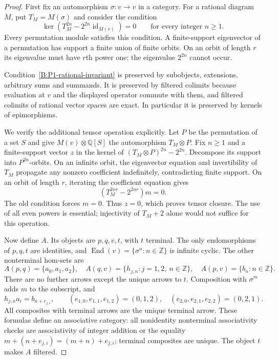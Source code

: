 \begin{proof}
First fix an automorphism $\sigma:v\to v$ in a category. For a rational
diagram $M$, put $T_M=M(\sigma)$ and consider the condition
\begin{equation}\label{B:P1-rational-invariant}
 \ker(T_M^{2n}-2^{2n}\operatorname{id}_{M(v)})=0
 \qquad\text{for every integer }n\geq1.
\end{equation}
Every permutation module satisfies this condition. A finite-support
eigenvector of a permutation has support a finite union of finite
orbits. On an orbit of length $r$ its eigenvalue must have $r$th power
one; the eigenvalue $2^{2n}$ cannot occur.

Condition~\eqref{B:P1-rational-invariant} is preserved by subobjects,
extensions, arbitrary sums and summands. It is preserved by filtered
colimits because evaluation at $v$ and the displayed operator commute
with them, and filtered colimits of rational vector spaces are exact.
In particular it is preserved by kernels of epimorphisms.

We verify the additional tensor operation explicitly. Let $P$ be the
permutation of a set $S$ and give $M(v)\otimes\mathbb Q[S]$ the
automorphism $T_M\otimes P$. Fix $n\geq1$ and a finite-support vector
$z$ in the kernel of
$(T_M\otimes P)^{2n}-2^{2n}$. Decompose its support into $P^{2n}$-orbits.
On an infinite orbit, the eigenvector equation and invertibility of
$T_M$ propagate any nonzero coefficient indefinitely, contradicting
finite support. On an orbit of length $r$, iterating the coefficient
equation gives
\[
 (T_M^{2nr}-2^{2nr})m=0.
\]
The old condition forces $m=0$. Thus $z=0$, which proves tensor
closure. The use of all even powers is essential; injectivity of
$T_M+2$ alone would not suffice for this operation.

Now define $A$. Its objects are $p,q,v,t$, with $t$ terminal. The only
endomorphisms of $p,q,t$ are identities, and
$\operatorname{End}(v)=\{\sigma^n:n\in\mathbb Z\}$ is infinite cyclic.
The other nonterminal hom-sets are
\[
 A(p,q)=\{a_0,a_1,a_2\},\quad
 A(q,v)=\{h_{j,n}:j=1,2,\ n\in\mathbb Z\},\quad
 A(p,v)=\{b_n:n\in\mathbb Z\}.
\]
There are no further arrows except the unique arrows to $t$.
Composition with $\sigma^m$ adds $m$ to the subscript, and
\[
 h_{j,n}a_i=b_{n+e_{j,i}},\qquad
 (e_{1,0},e_{1,1},e_{1,2})=(0,1,2),\quad
 (e_{2,0},e_{2,1},e_{2,2})=(0,2,1).
\]
All composites with terminal arrows are the unique terminal arrow.
These formulas define an associative category: all nonidentity
nonterminal associativity checks are associativity of integer addition
or the equality $m+(n+e_{j,i})=(m+n)+e_{j,i}$; terminal composites are
unique. The object $t$ makes $A$ filtered.


\end{proof}
